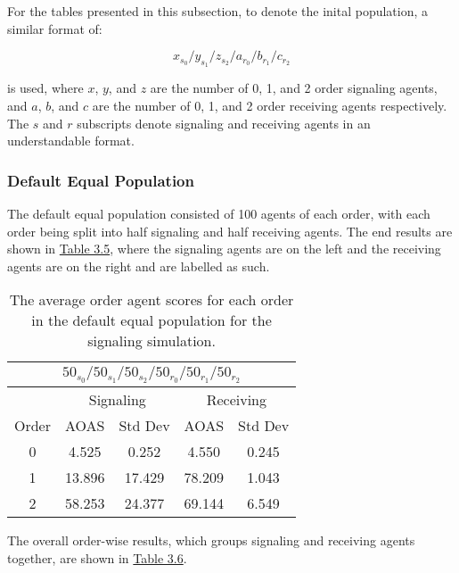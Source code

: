 For the tables presented in this subsection, to denote the inital population, a similar format of:

\begin{equation}
    x_{s_{0}} / y_{s_{1}} / z_{s_{2}} / a_{r_{0}} / b_{r_{1}} / c_{r_{2}}
\end{equation}

\noindent is used, where $x$, $y$, and $z$ are the number of 0, 1, and 2 order signaling agents, and $a$, $b$, and $c$ are the number of 0, 1, and 2 order receiving agents respectively. The $s$ and $r$ subscripts denote signaling and receiving agents in an understandable format.

\subsubsection{Default Equal Population}

The default equal population consisted of 100 agents of each order, with each order being split into half signaling and half receiving agents. The end results are shown in \hyperref[table:sig-default-equal]{Table 3.5}, where the signaling agents are on the left and the receiving agents are on the right and are labelled as such.   

\begin{table}[h]
    \centering
    \begin{tabular}{|c|c|c|c|c|}
    \hline
    \multicolumn{5}{|c|}{$50_{s_{0}}/50_{s_{1}}/50_{s_{2}}/50_{r_{0}}/50_{r_{1}}/50_{r_{2}}$} \\
    \hline
    \multicolumn{1}{|c|}{} & \multicolumn{2}{|c|}{Signaling} & \multicolumn{2}{|c|}{Receiving} \\
    \hline
    Order & AOAS & Std Dev & AOAS & Std Dev \\
    \hline
    0     & 4.525   & 0.252    & 4.550   & 0.245   \\
    1     & 13.896  & 17.429   & 78.209  & 1.043   \\
    2     & 58.253  & 24.377   & 69.144  & 6.549   \\
    \hline
    \end{tabular}
    \caption{The average order agent scores for each order in the default equal population for the signaling simulation.}
    \label{table:sig-default-equal}
\end{table}

The overall order-wise results, which groups signaling and receiving agents together, are shown in \hyperref[table:sig-default-equal-overall]{Table 3.6}.

